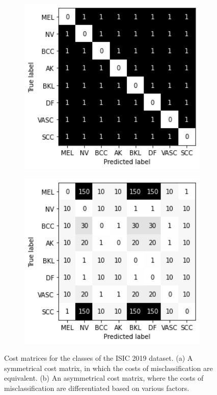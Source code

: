 \begin{figure}[!h]
	\centering
	\begin{subfigure}{0.49\textwidth}
		\centering
		\includegraphics[width=1\textwidth]{images/cost_matrix_1.png}
		\caption{}
		\label{fig:multiclasssymcosts}
	\end{subfigure}
	\begin{subfigure}{0.49\textwidth}
		\centering
		\includegraphics[width=1\textwidth]{images/cost_matrix_2.png}
		\caption{}
		\label{fig:multiclassasymcosts}
	\end{subfigure}
	\caption{Cost matrices for the classes of the ISIC 2019 dataset. (a) A symmetrical cost matrix, in which the costs of misclassification are equivalent. (b) An asymmetrical cost matrix, where the costs of misclassification are differentiated based on various factors.}
	\label{fig:multiclasscosts}
\end{figure}

